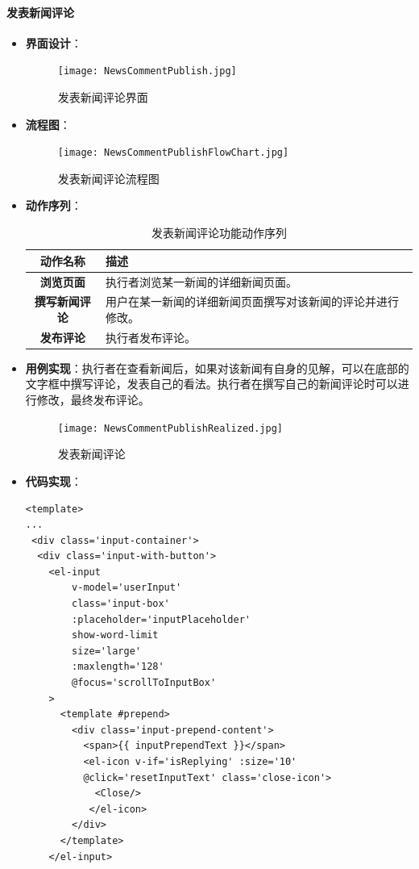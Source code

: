 \paragraph{发表新闻评论}
\begin{itemize}
	\item \textbf{界面设计}：
	\begin{figure}[H]
		\centering
		\texttt{[image: NewsCommentPublish.jpg]}
		\caption{发表新闻评论界面}
		\label{NewsCommentPublish}
	\end{figure}
	\item \textbf{流程图}：
	\begin{figure}[H]
		\centering
		\texttt{[image: NewsCommentPublishFlowChart.jpg]}
		\caption{发表新闻评论流程图}
		\label{NewsCommentPublishFlowChart}
	\end{figure}
	\item \textbf{动作序列}：
	\begin{table}[H]
		\centering
		\caption{发表新闻评论功能动作序列}
		\renewcommand\arraystretch{1.5}
		\begin{tabular}{|c|>{\raggedright\arraybackslash}p{10cm}|}
			\hline
			\textbf{动作名称} & \textbf{描述} \\ \hline
			\textbf{浏览页面} & 执行者浏览某一新闻的详细新闻页面。 \\ \hline
			\textbf{撰写新闻评论} & 用户在某一新闻的详细新闻页面撰写对该新闻的评论并进行修改。 \\ \hline
			\textbf{发布评论} & 执行者发布评论。 \\ \hline
		\end{tabular}
	\end{table}
	\item \textbf{用例实现}：执行者在查看新闻后，如果对该新闻有自身的见解，可以在底部的文字框中撰写评论，发表自己的看法。执行者在撰写自己的新闻评论时可以进行修改，最终发布评论。
	\begin{figure}[H]
		\centering
		\texttt{[image: NewsCommentPublishRealized.jpg]}
		\caption{发表新闻评论}
		\label{NewsCommentPublishRealized}
	\end{figure}
	\item \textbf{代码实现}：
	\begin{verbatim}
<template>
...
 <div class='input-container'>
  <div class='input-with-button'>
    <el-input
        v-model='userInput'
        class='input-box'
        :placeholder='inputPlaceholder'
        show-word-limit
        size='large'
        :maxlength='128'
        @focus='scrollToInputBox'
    >
      <template #prepend>
        <div class='input-prepend-content'>
          <span>{{ inputPrependText }}</span>
          <el-icon v-if='isReplying' :size='10' 
          @click='resetInputText' class='close-icon'>
            <Close/>
           </el-icon>
        </div>
      </template>
    </el-input>
	

\end{verbatim}
\end{itemize}
